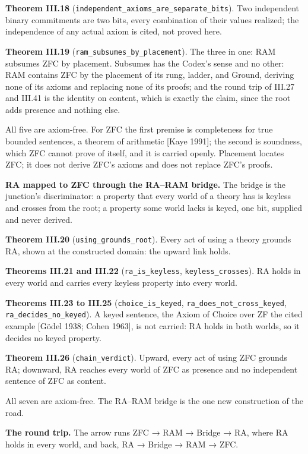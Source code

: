 \documentclass[10pt]{article}
\begin{document}
\textbf{Theorem III.18}
(\texttt{independent\_axioms\_are\_separate\_bits}). Two independent
binary commitments are two bits, every combination of their values
realized; the independence of any actual axiom is cited, not proved
here.

\textbf{Theorem III.19} (\texttt{ram\_subsumes\_by\_placement}). The
three in one: RAM subsumes ZFC by placement. Subsumes has the Codex's
sense and no other: RAM contains ZFC by the placement of its rung,
ladder, and Ground, deriving none of its axioms and replacing none of
its proofs; and the round trip of III.27 and III.41 is the identity on
content, which is exactly the claim, since the root adds presence and
nothing else.

All five are axiom-free. For ZFC the first premise is completeness for
true bounded sentences, a theorem of arithmetic {[}Kaye 1991{]}; the
second is soundness, which ZFC cannot prove of itself, and it is carried
openly. Placement locates ZFC; it does not derive ZFC's axioms and does
not replace ZFC's proofs.

\textbf{RA mapped to ZFC through the RA--RAM bridge.} The bridge is the
junction's discriminator: a property that every world of a theory has is
keyless and crosses from the root; a property some world lacks is keyed,
one bit, supplied and never derived.

\textbf{Theorem III.20} (\texttt{using\_grounds\_root}). Every act of
using a theory grounds RA, shown at the constructed domain: the upward
link holds.

\textbf{Theorems III.21 and III.22} (\texttt{ra\_is\_keyless},
\texttt{keyless\_crosses}). RA holds in every world and carries every
keyless property into every world.

\textbf{Theorems III.23 to III.25} (\texttt{choice\_is\_keyed},
\texttt{ra\_does\_not\_cross\_keyed}, \texttt{ra\_decides\_no\_keyed}).
A keyed sentence, the Axiom of Choice over ZF the cited example {[}Gödel
1938; Cohen 1963{]}, is not carried: RA holds in both worlds, so it
decides no keyed property.

\textbf{Theorem III.26} (\texttt{chain\_verdict}). Upward, every act of
using ZFC grounds RA; downward, RA reaches every world of ZFC as
presence and no independent sentence of ZFC as content.

All seven are axiom-free. The RA--RAM bridge is the one new construction
of the road.

\textbf{The round trip.} The arrow runs ZFC → RAM → Bridge → RA, where
RA holds in every world, and back, RA → Bridge → RAM → ZFC.
\end{document}
